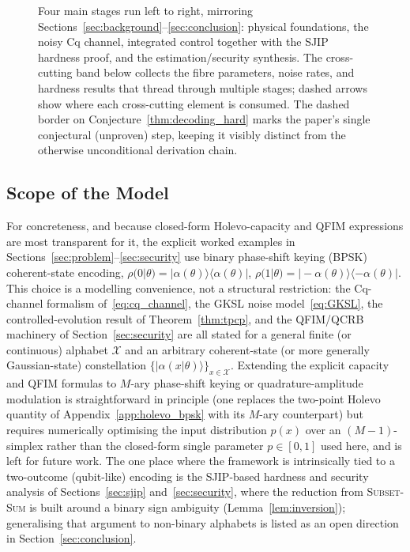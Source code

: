 \documentclass[journal,twocolumn]{IEEEtran}
\theoremstyle{definition}
\theoremstyle{plain}
\begin{document}
\begin{figure}[t]
{%
}
\caption{Four main
  stages run left to right, mirroring
  Sections~\ref{sec:background}--\ref{sec:conclusion}: physical
  foundations, the noisy Cq channel, integrated control together with
  the SJIP hardness proof, and the estimation/security synthesis.
  The cross-cutting band below collects the fibre parameters, noise
  rates, and hardness results that thread through multiple stages;
  dashed arrows show where each cross-cutting element is consumed.
  The dashed border on Conjecture~\ref{thm:decoding_hard} marks
  the paper's single conjectural (unproven) step, keeping it visibly
  distinct from the otherwise unconditional derivation chain.}
\label{fig:framework}
\end{figure}

\subsection{Scope of the Model}
\label{subsec:scope}

For concreteness, and because closed-form Holevo-capacity and QFIM
expressions are most transparent for it, the explicit worked
examples in Sections~\ref{sec:problem}--\ref{sec:security} use
binary phase-shift keying (BPSK) coherent-state encoding,
$\rho(0|\theta)=|\alpha(\theta)\rangle\langle\alpha(\theta)|$,
$\rho(1|\theta)=|-\alpha(\theta)\rangle\langle-\alpha(\theta)|$. This
choice is a modelling convenience, not a structural restriction: the
Cq-channel formalism of~\eqref{eq:cq_channel}, the GKSL noise
model~\eqref{eq:GKSL}, the controlled-evolution result of
Theorem~\ref{thm:tpcp}, and the QFIM/QCRB machinery of
Section~\ref{sec:security} are all stated for a general finite (or
continuous) alphabet $\mathcal{X}$ and an arbitrary coherent-state (or
more generally Gaussian-state) constellation $\{|\alpha(x|\theta)\rangle\}_{x\in\mathcal X}$.
Extending the explicit capacity and QFIM formulas to $M$-ary
phase-shift keying or quadrature-amplitude modulation is
straightforward in principle (one replaces the two-point Holevo
quantity of Appendix~\ref{app:holevo_bpsk} with its $M$-ary
counterpart) but requires numerically optimising the input
distribution $p(x)$ over an $(M-1)$-simplex rather than the closed-form
single parameter $p\in[0,1]$ used here, and is left for future work.
The one place where the framework is intrinsically tied to a
two-outcome (qubit-like) encoding is the SJIP-based hardness and
security analysis of Sections~\ref{sec:sjip} and~\ref{sec:security},
where the reduction from \textsc{Subset-Sum} is built around a
binary sign ambiguity (Lemma~\ref{lem:inversion}); generalising that
argument to non-binary alphabets is listed as an open direction in
Section~\ref{sec:conclusion}.
\end{document}
